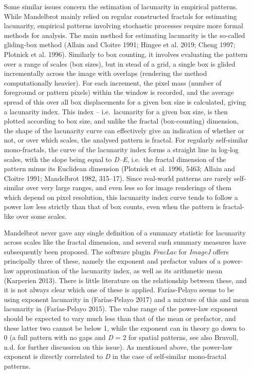 \documentclass[
  12pt,
  a4paper, twoside]{book}
\begin{document}
Some similar issues concern the estimation of lacunarity in empirical patterns. While Mandelbrot mainly relied on regular constructed fractals for estimating lacunarity, empirical patterns involving stochastic processes require more formal methods for analysis. The main method for estimating lacunarity is the so-called gliding-box method (Allain and Cloitre 1991; Hingee et al. 2019; Cheng 1997; Plotnick et al. 1996). Similarly to box counting, it involves evaluating the pattern over a range of scales (box sizes), but in stead of a grid, a single box is glided incrementally across the image with overlaps (rendering the method computationally heavier). For each increment, the pixel mass (number of foreground or pattern pixels) within the window is recorded, and the average spread of this over all box displacements for a given box size is calculated, giving a lacunarity index. This index -- i.e.~lacunarity for a given box size, is then plotted according to box size, and unlike the fractal (box-counting) dimension, the shape of the lacunarity curve can effectively give an indication of whether or not, or over which scales, the analysed pattern is fractal. For regularly self-similar mono-fractals, the curve of the lacunarity index forms a straight line in log-log scales, with the slope being equal to \emph{D--E}, i.e.~the fractal dimension of the pattern minus its Euclidean dimension (Plotnick et al. 1996, 5463; Allain and Cloitre 1991; Mandelbrot 1982, 315--17). Since real-world patterns are rarely self-similar over very large ranges, and even less so for image renderings of them which depend on pixel resolution, this lacunarity index curve tends to follow a power law less strictly than that of box counts, even when the pattern is fractal-like over some scales.

Mandelbrot never gave any single definition of a summary statistic for lacunarity across scales like the fractal dimension, and several such summary measures have subsequently been proposed. The software plugin \emph{FracLac} for \emph{ImageJ} offers principally three of these, namely the exponent and prefactor values of a power-law approximation of the lacunarity index, as well as its arithmetic mean (Karperien 2013). There is little literature on the relationship between these, and it is not always clear which one of these is applied. Farías-Pelayo seems to be using exponent lacunarity in (Farías-Pelayo 2017) and a mixture of this and mean lacunarity in (Farías-Pelayo 2015). The value range of the power-law exponent should be expected to vary much less than that of the mean or prefactor, and these latter two cannot be below 1, while the exponent can in theory go down to 0 (a full pattern with no gaps and \emph{D} = 2 for spatial patterns, see also Bruvoll, n.d. for further discussion on this issue). As mentioned above, the power-law exponent is directly correlated to \emph{D} in the case of self-similar mono-fractal patterns.
\end{document}
